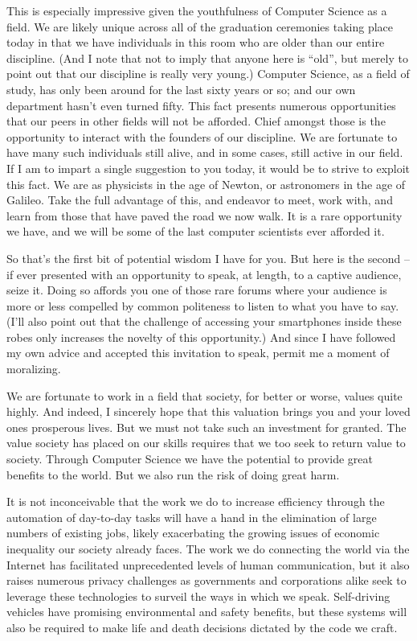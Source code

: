 \documentclass[11pt,twocolumn,letterpaper]{article}
\begin{document}
This is especially impressive given the youthfulness of Computer
Science as a field. We are likely unique across all of the graduation
ceremonies taking place today in that we have individuals in this room
who are older than our entire discipline. (And I note that not to
imply that anyone here is ``old'', but merely to point out that our
discipline is really very young.) Computer Science, as a field of
study, has only been around for the last sixty years or so; and our
own department hasn't even turned fifty. This fact presents numerous
opportunities that our peers in other fields will not be afforded.
Chief amongst those is the opportunity to interact with the founders
of our discipline. We are fortunate to have many such individuals
still alive, and in some cases, still active in our field. If I am to
impart a single suggestion to you today, it would be to strive to
exploit this fact. We are as physicists in the age of Newton, or
astronomers in the age of Galileo. Take the full advantage of this,
and endeavor to meet, work with, and learn from those that have paved
the road we now walk. It is a rare opportunity we have, and we will be
some of the last computer scientists ever afforded it.

So that's the first bit of potential wisdom I have for you. But here
is the second -- if ever presented with an opportunity to speak, at
length, to a captive audience, seize it. Doing so affords you one of
those rare forums where your audience is more or less compelled by
common politeness to listen to what you have to say. (I'll also point
out that the challenge of accessing your smartphones inside these
robes only increases the novelty of this opportunity.) And since I
have followed my own advice and accepted this invitation to speak,
permit me a moment of moralizing.

We are fortunate to work in a field that society, for better or worse,
values quite highly. And indeed, I sincerely hope that this valuation
brings you and your loved ones prosperous lives. But we must not take
such an investment for granted. The value society has placed on our
skills requires that we too seek to return value to society. Through
Computer Science we have the potential to provide great benefits to
the world. But we also run the risk of doing great harm.

It is not inconceivable that the work we do to increase efficiency
through the automation of day-to-day tasks will have a hand in the
elimination of large numbers of existing jobs, likely exacerbating the
growing issues of economic inequality our society already faces. The
work we do connecting the world via the Internet has facilitated
unprecedented levels of human communication, but it also raises
numerous privacy challenges as governments and corporations alike seek
to leverage these technologies to surveil the ways in which we speak.
Self-driving vehicles have promising environmental and safety
benefits, but these systems will also be required to make life and
death decisions dictated by the code we craft.
\end{document}
